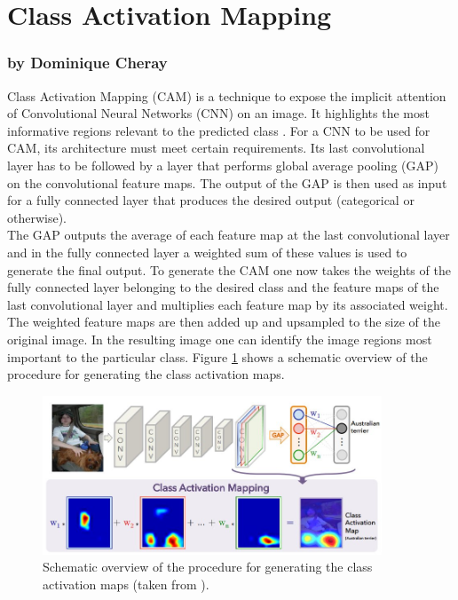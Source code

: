 \documentclass[11pt]{report}
\begin{document}
\section {Class Activation Mapping}
\label{CAM}
\subsubsection{by Dominique Cheray}
Class Activation Mapping (CAM) is a technique to expose the implicit attention
of Convolutional Neural Networks (CNN) on an image. It highlights the most
informative regions relevant to the predicted class \cite{zhou2016learning}. For a
CNN to be used for CAM, its architecture must meet certain requirements. Its
last convolutional layer has to be followed by a layer that performs global
average pooling (GAP) on the convolutional feature maps. The output of the GAP
is then used as input for a fully connected layer that produces the desired
output (categorical or otherwise). \\
The GAP outputs the average of each feature map at the last convolutional layer
and in the fully connected layer a weighted sum of these values is used to
generate the final output. To generate the CAM one now takes the weights of the
fully connected layer belonging to the desired class and the feature maps of the
last convolutional layer and multiplies each feature map by its associated
weight. The weighted feature maps are then added up and upsampled to the size of
the original image. In the resulting image one can identify the image regions
most important to the particular class. Figure \ref{SchematicCAM} shows a
schematic overview of the procedure for generating the class activation maps.
\begin{figure}
  \centering
  \includegraphics[width=0.9\textwidth]{CAM_graphik}
  \caption{Schematic overview of the procedure for generating the class activation maps (taken from
    \cite{zhou2016learning}).}
  \label{SchematicCAM}
\end{figure}
\end{document}
